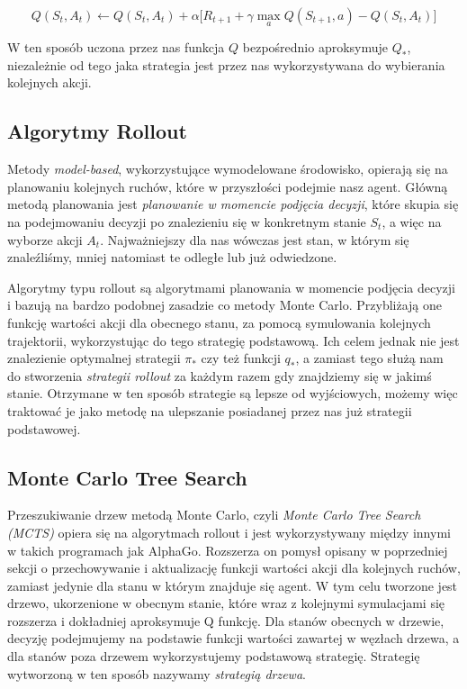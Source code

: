 \documentclass[licencjacka]{pracamgr}
\begin{document}
$$ Q(S_t, A_t) \leftarrow Q(S_t, A_t) + \alpha \big[R_{t+1} + \gamma \max_a Q(S_{t+1}, a) - Q(S_t, A_t) \big] $$

W ten sposób uczona przez nas funkcja $Q$ bezpośrednio aproksymuje $Q_\ast$, niezależnie od tego jaka strategia jest przez nas wykorzystywana do wybierania kolejnych akcji.

\subsection{Algorytmy Rollout}

Metody \emph{model-based}, wykorzystujące wymodelowane środowisko, opierają się na planowaniu kolejnych ruchów, które w przyszłości podejmie nasz agent. Główną metodą planowania jest \emph{planowanie w momencie podjęcia decyzji}, które skupia się na podejmowaniu decyzji po znalezieniu się w konkretnym stanie $S_t$, a więc na wyborze akcji $A_t$. Najważniejszy dla nas wówczas jest stan, w którym się znaleźliśmy, mniej natomiast te odległe lub już odwiedzone. 

Algorytmy typu rollout są algorytmami planowania w momencie podjęcia decyzji  i bazują na bardzo podobnej zasadzie co metody Monte Carlo. Przybliżają one funkcję wartości akcji dla obecnego stanu, za pomocą symulowania kolejnych trajektorii, wykorzystując do tego strategię podstawową. Ich celem jednak nie jest znalezienie optymalnej strategii $\pi_\ast$ czy też funkcji $q_\ast$, a zamiast tego służą nam do stworzenia \emph{strategii rollout} za każdym razem gdy znajdziemy się w jakimś stanie. Otrzymane w ten sposób strategie są lepsze od wyjściowych, możemy więc traktować je jako metodę na ulepszanie posiadanej przez nas już strategii podstawowej.

\subsection{Monte Carlo Tree Search}

Przeszukiwanie drzew metodą Monte Carlo, czyli \emph{Monte Carlo Tree Search (MCTS)} \cite{MCTS} opiera się na algorytmach rollout i jest wykorzystywany między innymi w takich programach jak AlphaGo\cite{alphago2016, alphagozero}. 
Rozszerza on pomysł opisany w poprzedniej sekcji o przechowywanie i aktualizację funkcji wartości akcji dla kolejnych ruchów, zamiast jedynie dla stanu w którym znajduje się agent. W tym celu tworzone jest drzewo, ukorzenione w obecnym stanie, które wraz z kolejnymi symulacjami się rozszerza i dokładniej aproksymuje Q funkcję. Dla stanów obecnych w drzewie, decyzję podejmujemy na podstawie funkcji wartości zawartej w węzłach drzewa, a dla stanów poza drzewem wykorzystujemy podstawową strategię. Strategię wytworzoną w ten sposób nazywamy \emph{strategią drzewa}.
\end{document}
